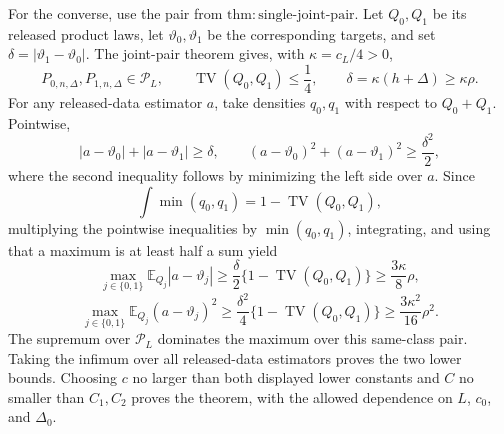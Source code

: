For the converse, use the pair from \(\mathrm{thm:single\text{-}joint\text{-}pair}\).  Let \(Q_0,Q_1\) be its released product laws, let \(\vartheta_0,\vartheta_1\) be the corresponding targets, and set \(\delta=|\vartheta_1-\vartheta_0|\).  The joint-pair theorem gives, with \(\kappa=c_L/4>0\),
\[
 P_{0,n,\Delta},P_{1,n,\Delta}\in\mathcal P_L,
 \qquad
 \operatorname{TV}(Q_0,Q_1)\leq\frac14,
 \qquad
 \delta=\kappa(h+\Delta)\geq\kappa\rho.
\]
For any released-data estimator \(a\), take densities \(q_0,q_1\) with respect to \(Q_0+Q_1\).  Pointwise,
\[
 |a-\vartheta_0|+|a-\vartheta_1|\geq\delta,
 \qquad
 (a-\vartheta_0)^2+(a-\vartheta_1)^2\geq\frac{\delta^2}{2},
\]
where the second inequality follows by minimizing the left side over \(a\).  Since
\[
 \int\min(q_0,q_1)=1-\operatorname{TV}(Q_0,Q_1),
\]
multiplying the pointwise inequalities by \(\min(q_0,q_1)\), integrating, and using that a maximum is at least half a sum yield
\[
 \max_{j\in\{0,1\}}\mathbb E_{Q_j}|a-\vartheta_j|
 \geq\frac\delta2\{1-\operatorname{TV}(Q_0,Q_1)\}
 \geq\frac{3\kappa}{8}\rho,
\]
\[
 \max_{j\in\{0,1\}}\mathbb E_{Q_j}(a-\vartheta_j)^2
 \geq\frac{\delta^2}{4}\{1-\operatorname{TV}(Q_0,Q_1)\}
 \geq\frac{3\kappa^2}{16}\rho^2.
\]
The supremum over \(\mathcal P_L\) dominates the maximum over this same-class pair.  Taking the infimum over all released-data estimators proves the two lower bounds.  Choosing \(c\) no larger than both displayed lower constants and \(C\) no smaller than \(C_1,C_2\) proves the theorem, with the allowed dependence on \(L\), \(c_0\), and \(\Delta_0\).
